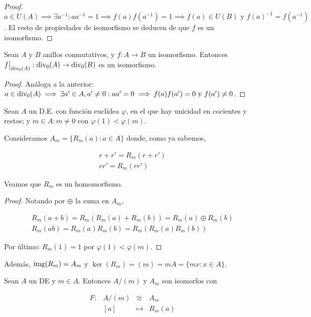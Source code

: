 \begin{proof}
  $a \in U(A) \implies \exists a^{-1} : aa^{-1} = 1 \implies f(a)f(a^{-1}) = 1 \implies f(a) \in U(B) \text{ y } f(a)^{-1} = f(a^{-1})$.
  El resto de propiedades de isomorfismo se deducen de que $f$ es un isomorfismo.
\end{proof}

\begin{nprop}
  Sean $A$ y $B$ anillos conmutativos, y $f: A \to B$ un isomorfismo. Entonces $\restr{f}{\rdiv_0(A)} : \rdiv_0(A) \to \rdiv_0(B)$
  es un isomorfismo.
\end{nprop}

\begin{proof}
  Análoga a la anterior: $a \in \operatorname*{div}_0(A) \implies \exists a' \in A, a' \ne 0 : aa' = 0 \implies f(a)f(a') = 0 \text{ y } f(a') \ne 0$.
\end{proof}


\begin{nprop}
  Sean $A$ un D.E. con función euclídea $\varphi$, en el que hay unicidad en cocientes y restos; y $m\in A: m\ne 0$ con $ \varphi(1) < \varphi(m)$.

  Consideramos $A_m = \{R_m(a): a \in A\}$ donde, como ya sabemos,

  $$\begin{array}{l}
	r+r' = R_m(r+r')\\
	rr' = R_m(rr')
  \end{array}$$

  Veamos que $R_m$ es un homomorfismo.\\
  \begin{proof}
    Notando por $\oplus$ la suma en $A_m$,

    \[
    \begin{array}{l}
      R_m(a+b) = R_m(R_m(a)+R_m(b)) = R_m(a) \oplus R_m(b) \\
      R_m(ab) = R_m(a)R_m(b) = R_m(R_m(a)R_m(b))
    \end{array}
    \]

    Por último: $R_m(1) = 1$ por $\varphi(1) < \varphi(m)$.
\end{proof}
\end{nprop}

Además, $\operatorname*{img}(R_m) = A_m$ y $\ker(R_m) = (m) = mA = \{mx : x\in A\}$.

\begin{ncor}
  Sean $A$ un DE y $m \in A$. Entonces $A/(m)$ y $A_m$ son isomorfos con

  \[
  \begin{array}{lrll}
    F : & A/(m) & \cong & A_m \\
        & [a] & \mapsto & R_m(a)
  \end{array}
  \]
\end{ncor}



